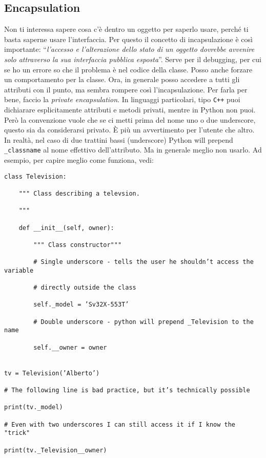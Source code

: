 \documentclass[10pt, a4paper, titlepage]{book}
\begin{document}
\subsection{Encapsulation}

Non ti interessa sapere cosa c'è dentro un oggetto per saperlo usare, perché ti basta saperne usare l'interfaccia.
Per questo il concetto di incapsulazione è così importante: ``\textit{l'accesso e l'alterazione dello stato di un oggetto dovrebbe avvenire solo attraverso la sua interfaccia pubblica esposta}''.
Serve per il debugging, per cui se ho un errore so che il problema è nel codice della classe. Posso anche forzare un comportamento per la classe.
Ora, in generale posso accedere a tutti gli attributi con il punto, ma sembra rompere così l'incapsulazione. Per farla per bene, faccio la \textit{private encapsulation}. 
In linguaggi particolari, tipo \texttt{C++} puoi dichiarare esplicitamente attributi e metodi privati, mentre in Python non puoi. Però la convenzione vuole che se ci metti prima del nome uno o due underscore, questo sia da considerarsi privato.
È più un avvertimento per l'utente che altro. In realtà, nel caso di due trattini bassi (underscore) Python will prepend \texttt{\_classname} al nome effettivo dell'attributo. Ma in generale meglio non usarlo.
Ad esempio, per capire meglio come funziona, vedi:
\begin{verbatim}
class Television:

	""" Class describing a televsion.

	"""

	def __init__(self, owner):

		""" Class constructor"""

		# Single underscore - tells the user he shouldn’t access the variable

		# directly outside the class

		self._model = ’Sv32X-553T’

		# Double underscore - python will prepend _Television to the name

		self.__owner = owner


tv = Television(’Alberto’)

# The following line is bad practice, but it’s technically possible

print(tv._model)

# Even with two underscores I can still access it if I know the "trick"

print(tv._Television__owner)
\end{verbatim}
\end{document}

